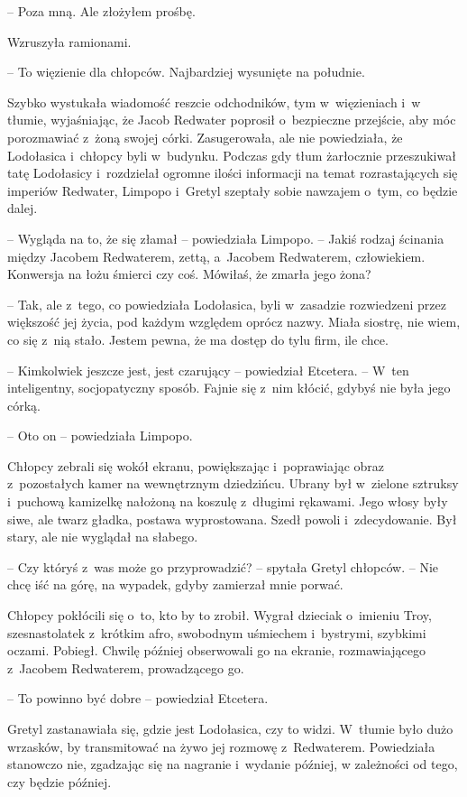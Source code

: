 \documentclass[oneside,polish,11pt,sfheadings]{mwbk}
\begin{document}
-- Poza mną. Ale złożyłem prośbę.

Wzruszyła ramionami. 

-- To więzienie dla chłopców. Najbardziej wysunięte
na południe.

Szybko wystukała wiadomość reszcie odchodników, tym w~więzieniach i~w tłumie, wyjaśniając, że Jacob Redwater poprosił o~bezpieczne przejście,
aby móc porozmawiać z~żoną swojej córki. Zasugerowała, ale nie
powiedziała, że Lodołasica i~chłopcy byli w~budynku. Podczas gdy tłum
żarłocznie przeszukiwał tatę Lodołasicy i~rozdzielał ogromne ilości
informacji na temat rozrastających się imperiów Redwater, Limpopo i~Gretyl szeptały sobie nawzajem o~tym, co będzie dalej.

-- Wygląda na to, że się złamał -- powiedziała Limpopo. -- Jakiś rodzaj
ścinania między Jacobem Redwaterem, zettą, a~Jacobem Redwaterem,
człowiekiem. Konwersja na łożu śmierci czy coś. Mówiłaś, że zmarła jego
żona?

-- Tak, ale z~tego, co powiedziała Lodołasica, byli w~zasadzie
rozwiedzeni przez większość jej życia, pod każdym względem oprócz nazwy.
Miała siostrę, nie wiem, co się z~nią stało. Jestem pewna, że ma dostęp
do tylu firm, ile chce.

-- Kimkolwiek jeszcze jest, jest czarujący -- powiedział Etcetera. -- W~ten
inteligentny, socjopatyczny sposób. Fajnie się z~nim kłócić, gdybyś nie
była jego córką.

-- Oto on -- powiedziała Limpopo. 

Chłopcy zebrali się wokół ekranu,
powiększając i~poprawiając obraz z~pozostałych kamer na wewnętrznym
dziedzińcu. Ubrany był w~zielone sztruksy i~puchową kamizelkę nałożoną
na koszulę z~długimi rękawami. Jego włosy były siwe, ale twarz gładka,
postawa wyprostowana. Szedł powoli i~zdecydowanie. Był stary, ale nie
wyglądał na słabego.

-- Czy któryś z~was może go przyprowadzić? -- spytała Gretyl chłopców. -- Nie chcę iść na górę, na wypadek, gdyby zamierzał mnie porwać.

Chłopcy pokłócili się o~to, kto by to zrobił. Wygrał dzieciak o~imieniu
Troy, szesnastolatek z~krótkim afro, swobodnym uśmiechem i~bystrymi,
szybkimi oczami. Pobiegł. Chwilę później obserwowali go na ekranie,
rozmawiającego z~Jacobem Redwaterem, prowadzącego go.

-- To powinno być dobre -- powiedział Etcetera.

Gretyl zastanawiała się, gdzie jest Lodołasica, czy to widzi. W~tłumie
było dużo wrzasków, by transmitować na żywo jej rozmowę z~Redwaterem.
Powiedziała stanowczo nie, zgadzając się na nagranie i~wydanie później,
w zależności od tego, czy będzie później.
\end{document}
